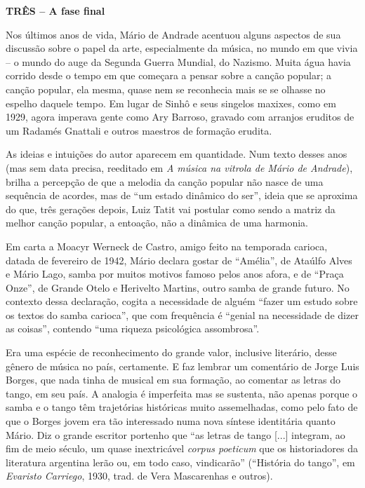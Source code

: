 \textbf{TRÊS -- A fase final}

Nos últimos anos de vida, Mário de Andrade acentuou alguns aspectos de
sua discussão sobre o papel da arte, especialmente da música, no mundo
em que vivia -- o mundo do auge da Segunda Guerra Mundial, do Nazismo.
Muita água havia corrido desde o tempo em que começara a pensar sobre a
canção popular; a canção popular, ela mesma, quase nem se reconhecia
mais se se olhasse no espelho daquele tempo. Em lugar de Sinhô e seus
singelos maxixes, como em 1929, agora imperava gente como Ary Barroso,
gravado com arranjos eruditos de um Radamés Gnattali e outros maestros
de formação erudita.

As ideias e intuições do autor aparecem em quantidade. Num texto desses
anos (mas sem data precisa, reeditado em \emph{A música na vitrola de
Mário de Andrade}), brilha a percepção de que a melodia da canção
popular não nasce de uma sequência de acordes, mas de ``um estado
dinâmico do ser'', ideia que se aproxima do que, três gerações depois,
Luiz Tatit vai postular como sendo a matriz da melhor canção popular, a
entoação, não a dinâmica de uma harmonia.

Em carta a Moacyr Werneck de Castro, amigo feito na temporada carioca,
datada de fevereiro de 1942, Mário declara gostar de ``Amélia'', de
Ataúlfo Alves e Mário Lago, samba por muitos motivos famoso pelos anos
afora, e de ``Praça Onze'', de Grande Otelo e Herivelto Martins, outro
samba de grande futuro. No contexto dessa declaração, cogita a
necessidade de alguém ``fazer um estudo sobre os textos do samba
carioca'', que com frequência é ``genial na necessidade de dizer as
coisas'', contendo ``uma riqueza psicológica assombrosa''.

Era uma espécie de reconhecimento do grande valor, inclusive literário,
desse gênero de música no país, certamente. E faz lembrar um comentário
de Jorge Luis Borges, que nada tinha de musical em sua formação, ao
comentar as letras do tango, em seu país. A analogia é imperfeita mas se
sustenta, não apenas porque o samba e o tango têm trajetórias históricas
muito assemelhadas, como pelo fato de que o Borges jovem era tão
interessado numa nova síntese identitária quanto Mário. Diz o grande
escritor portenho que ``as letras de tango {[}...{]} integram, ao fim de
meio século, um quase inextricável \emph{corpus poeticum} que os
historiadores da literatura argentina lerão ou, em todo caso,
vindicarão'' (``História do tango'', em \emph{Evaristo Carriego}, 1930,
trad. de Vera Mascarenhas e outros).

